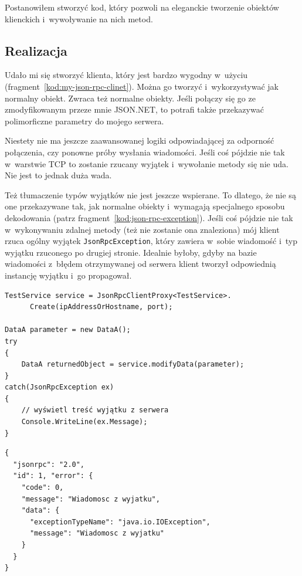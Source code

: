 Postanowiłem stworzyć kod, który pozwoli na eleganckie tworzenie obiektów klienckich i~wywoływanie na nich metod.

\subsection{Realizacja}
Udało mi się stworzyć klienta, który jest bardzo wygodny w~użyciu (fragment~\ref{kod:my-json-rpc-clinet}).
Można go tworzyć i~wykorzystywać jak normalny obiekt. Zwraca też normalne obiekty.
Jeśli połączy się go ze zmodyfikowanym przeze mnie JSON.NET, to potrafi także przekazywać polimorficzne parametry do mojego serwera.

Niestety nie ma jeszcze zaawansowanej logiki odpowiadającej za odporność połączenia, czy ponowne próby wysłania wiadomości. Jeśli coś pójdzie nie tak w~warstwie TCP to zostanie rzucany wyjątek i~wywołanie metody się nie uda.
Nie jest to jednak duża wada.

Też tłumaczenie typów wyjątków nie jest jeszcze wspierane.
To dlatego, że nie są one przekazywane tak, jak normalne obiekty i~wymagają specjalnego sposobu dekodowania (patrz fragment~\ref{kod:json-rpc-exception}).
Jeśli coś pójdzie nie tak w~wykonywaniu zdalnej metody (też nie zostanie ona znaleziona) mój klient rzuca ogólny wyjątek \texttt{JsonRpcException}, który zawiera w~sobie wiadomość i~typ wyjątku rzuconego po drugiej stronie.
Idealnie byłoby, gdyby na bazie wiadomości z~błędem otrzymywanej od serwera klient tworzył odpowiednią instancję wyjątku i~go propagował.

\begin{lstlisting}[float, frame=single, caption={Tworzenie obiektu proxy do obiektu zdalnego przy użyciu mojej implementacji klienta JSON-RPC pod .NET.}, label=kod:my-json-rpc-clinet]
TestService service = JsonRpcClientProxy<TestService>.
      Create(ipAddressOrHostname, port);

DataA parameter = new DataA();
try
{
    DataA returnedObject = service.modifyData(parameter);
}
catch(JsonRpcException ex)
{
    // wyświetl treść wyjątku z serwera
    Console.WriteLine(ex.Message);
}
\end{lstlisting}

\begin{lstlisting}[float, frame=single, caption={Wiadomość od serwera JSON-RPC zawierająca wyjątek.}, label=kod:json-rpc-exception]
{
  "jsonrpc": "2.0",
  "id": 1, "error": {
    "code": 0,
    "message": "Wiadomosc z wyjatku",
    "data": {
      "exceptionTypeName": "java.io.IOException",
      "message": "Wiadomosc z wyjatku"
    }
  }
}
\end{lstlisting}



